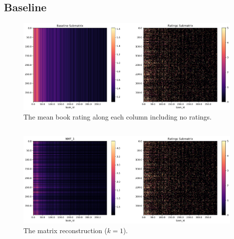 \documentclass[handout]{beamer}
\begin{document}
\subsection{Baseline}


\begin{frame}
 \begin{figure}[t]
    \includegraphics[width=\linewidth]{../image/goodreads-models/baseline-matrix.png}
    \caption[Baseline matrix]{The mean book rating along each column including no ratings.}
     \label{fig:baseline-matrix}
\end{figure}
\end{frame}

\subsection{}

\begin{frame}
 \begin{figure}[t]
    \includegraphics[width=\linewidth]{../image/goodreads-models/nmf-1-left.png}
    \caption[NMF-1]{The matrix reconstruction ($k=1$).}
     \label{fig:nmf-1}
\end{figure}
\end{frame}
\end{document}
